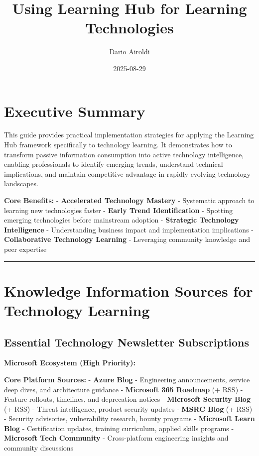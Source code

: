 \documentclass[
  letterpaper,
  DIV=11,
  numbers=noendperiod]{scrartcl}
\title{Using Learning Hub for Learning Technologies}
\author{Dario Airoldi}
\date{2025-08-29}
\renewcommand*\contentsname{Table of contents}
\newcommand\contentsname{Table of contents}
\begin{document}
\maketitle

\renewcommand*\contentsname{Table of contents}
{
\hypersetup{linkcolor=}
\setcounter{tocdepth}{3}
\tableofcontents
}

\section{Executive Summary}\label{executive-summary}

This guide provides practical implementation strategies for applying the
Learning Hub framework specifically to technology learning. It
demonstrates how to transform passive information consumption into
active technology intelligence, enabling professionals to identify
emerging trends, understand technical implications, and maintain
competitive advantage in rapidly evolving technology landscapes.

\textbf{Core Benefits:} - \textbf{Accelerated Technology Mastery} -
Systematic approach to learning new technologies faster - \textbf{Early
Trend Identification} - Spotting emerging technologies before mainstream
adoption - \textbf{Strategic Technology Intelligence} - Understanding
business impact and implementation implications - \textbf{Collaborative
Technology Learning} - Leveraging community knowledge and peer expertise

\begin{center}\rule{0.5\linewidth}{0.5pt}\end{center}

\section{Knowledge Information Sources for Technology
Learning}\label{knowledge-information-sources-for-technology-learning}

\subsection{Essential Technology Newsletter
Subscriptions}\label{essential-technology-newsletter-subscriptions}

\textbf{Microsoft Ecosystem (High Priority):}

\textbf{Core Platform Sources:} - \textbf{Azure Blog} - Engineering
announcements, service deep dives, and architecture guidance -
\textbf{Microsoft 365 Roadmap} (+ RSS) - Feature rollouts, timelines,
and deprecation notices - \textbf{Microsoft Security Blog} (+ RSS) -
Threat intelligence, product security updates - \textbf{MSRC Blog} (+
RSS) - Security advisories, vulnerability research, bounty programs -
\textbf{Microsoft Learn Blog} - Certification updates, training
curriculum, applied skills programs - \textbf{Microsoft Tech Community}
- Cross-platform engineering insights and community discussions
\end{document}
